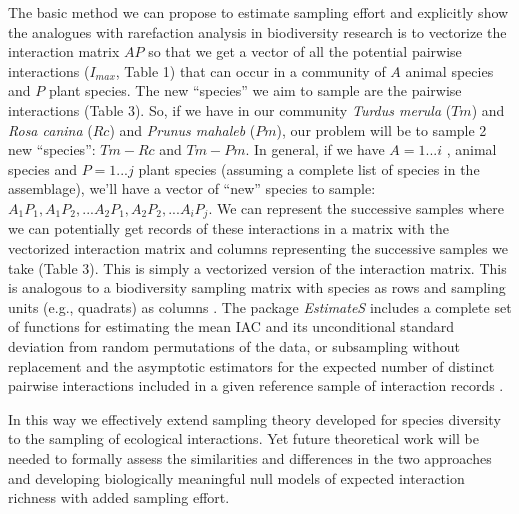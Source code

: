 \documentclass[12pt]{article}
\begin{document}
The basic method we can propose to estimate sampling effort and explicitly show the analogues with rarefaction analysis in biodiversity research is to vectorize the interaction matrix $AP$ so that we get a vector of all the potential pairwise interactions ($I_{max}$, Table 1) that can occur in a community of $A$ animal species and $P$ plant species. The new ``species'' we aim to sample are the pairwise interactions (Table 3). So, if we have in our community \emph{Turdus merula} ($Tm$) and \emph{Rosa canina} ($Rc$) and \emph{Prunus mahaleb} ($Pm$), our problem will be to sample 2 new ``species'': $Tm-Rc$ and $Tm-Pm$. In general, if we have $A= 1... i$ , animal species and $P = 1... j$ plant species (assuming a complete list of species in the assemblage), we'll have a vector of ``new'' species to sample: $A_1P_1, A_1P_2,... A_2P_1, A_2P_2, ... A_iP_j$. We can represent the successive samples where we can potentially get records of these interactions in a matrix with the vectorized interaction matrix and columns representing the successive samples we take (Table 3). This is simply a vectorized version of the interaction matrix. This is analogous to a biodiversity sampling matrix with species as rows and sampling units (e.g., quadrats) as columns \citep{Jordano:2009c}. The package \emph{EstimateS} \citep{Colwell:2013kj} includes a complete set of functions for estimating the mean IAC and its unconditional standard deviation from random permutations of the data, or subsampling without replacement \citep{Gotelli:2001uo} and the asymptotic estimators for the expected number of distinct pairwise interactions included in a given reference sample of interaction records \citeyearpar[see also the specaccum function in library vegan of the R Package, ][]{RCoreTeam:2010} \citep{Jordano:2009c,Olesen:2011a}.

In this way we effectively extend sampling theory developed for species diversity to the sampling of ecological interactions. Yet future theoretical work will be needed to formally assess the similarities and differences in the two approaches and developing biologically meaningful null models of expected interaction richness with added sampling effort.

\end{document}
